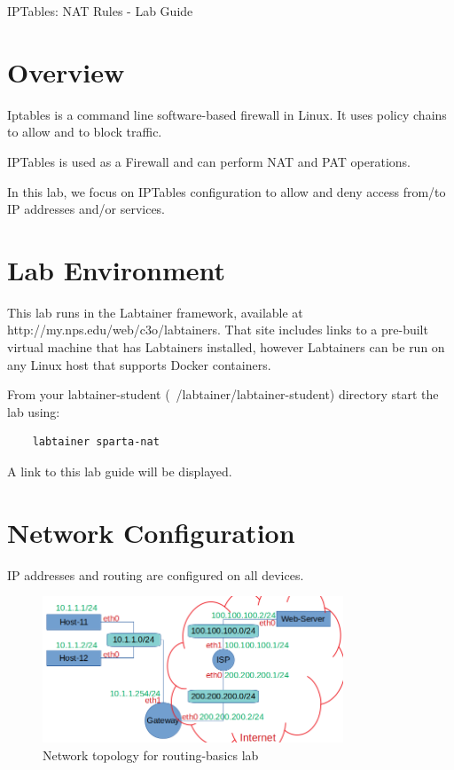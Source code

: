 


\begin{center}
{\LARGE IPTables: NAT Rules - Lab Guide}
\vspace{0.1in}\\
\end{center}

\copyrightnotice

\section{Overview}
Iptables is a command line software-based firewall in Linux. It uses policy chains to allow and to block traffic.

IPTables is used as a Firewall and can perform NAT and PAT operations.

In this lab, we focus on IPTables configuration to allow and deny access from/to IP addresses and/or services.

\section{Lab Environment}
This lab runs in the Labtainer framework,
available at http://my.nps.edu/web/c3o/labtainers.
That site includes links to a pre-built virtual machine
that has Labtainers installed, however Labtainers can
be run on any Linux host that supports Docker containers.

From your labtainer-student (~/labtainer/labtainer-student) directory start the lab using:
\begin{verbatim}
    labtainer sparta-nat
\end{verbatim}
\noindent A link to this lab guide will be displayed.

\section{Network Configuration}
IP addresses and routing are configured on all devices.

\begin{figure}[H]
\begin{center}
\includegraphics [width=0.8\textwidth]{labtainers-nat-lab-01.png}
\end{center}
\caption{Network topology for routing-basics lab}
\label{fig:topology}
\end{figure}

